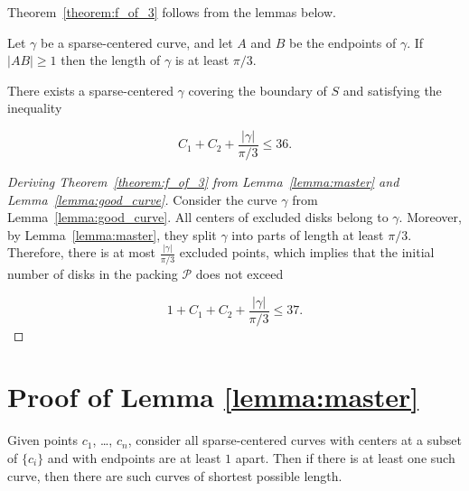 
Theorem~\ref{theorem:f_of_3} follows from the lemmas below.

\begin{lemma}
Let $\gamma$ be a sparse-centered curve, and let $A$ and $B$ be the endpoints of $\gamma$. If $|AB|\geq 1$ then the length of $\gamma$ is at least $\pi/3$.
\label{lemma:master}
\end{lemma}

\begin{lemma}
\label{lemma:good_curve}
There exists a sparse-centered $\gamma$ covering the boundary of $S$ and satisfying the inequality

$$C_1 + C_2 + \frac{|\gamma|}{\pi/3} \leq 36.$$
\end{lemma}

\begin{proof}[Deriving Theorem~\ref{theorem:f_of_3} from Lemma~\ref{lemma:master} and Lemma~\ref{lemma:good_curve}]
Consider the curve $\gamma$ from Lemma~\ref{lemma:good_curve}. All centers of excluded disks belong to $\gamma$. Moreover, by Lemma~\ref{lemma:master}, they split $\gamma$ into parts of length at least $\pi/3$. Therefore, there is at most $\frac{|\gamma|}{\pi/3}$ excluded points, which implies that the initial number of disks in the packing $\mathcal{P}$ does not exceed

$$1 + C_1 + C_2 + \frac{|\gamma|}{\pi/3} \leq 37.$$
\end{proof}

\section{Proof of Lemma \ref{lemma:master}}

\begin{lemma}
Given points $c_1$, \ldots, $c_n$, consider all sparse-centered curves with centers at a subset of $\{c_i\}$ and with endpoints are at least $1$ apart. Then if there is at least one such curve, then there are such curves of shortest possible length.
\end{lemma}

